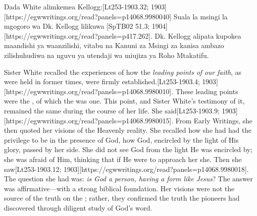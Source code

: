 Dada White alimkemea Kellogg:[Lt253-1903.32; 1903][https://egwwritings.org/read?panels=p14068.9980040] Suala la msingi la mgogoro wa Dk. Kellogg lilikuwa [SpTB02 51.3; 1904][https://egwwritings.org/read?panels=p417.262]. Dk. Kellogg alipata kupokea maandishi ya waanzilishi, vitabu na Kanuni za Msingi za kanisa ambazo zilishuhudiwa na nguvu ya utendaji wa miujiza ya Roho Mtakatifu.


Sister White recalled the experiences of how the \textit{leading points of our faith}, as were held in former times, were firmly established.[Lt253-1903.4; 1903][https://egwwritings.org/read?panels=p14068.9980010]. These leading points were the , of which the  was one. This point, and Sister White’s testimony of it, remained the same during the course of her life.  She said[Lt253-1903.9; 1903][https://egwwritings.org/read?panels=p14068.9980015]. From Early Writings, she then quoted her visions of the Heavenly reality. She recalled how she had had the privilege to be in the presence of God, how God, encircled by the light of His glory, passed by her side. She did not see God from the light He was encircled by; she was afraid of Him, thinking that if He were to approach her she. Then she saw[Lt253-1903.12; 1903][https://egwwritings.org/read?panels=p14068.9980018]. The question she had was: \textit{is God a person, having a form like Jesus}? The answer was affirmative—with a strong biblical foundation. Her visions were not the source of the truth on the ; rather, they confirmed the truth the pioneers had discovered through diligent study of God’s word.


